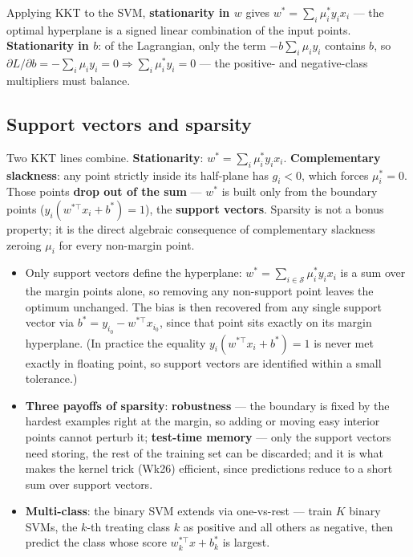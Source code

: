 \documentclass[11pt, a4paper]{article}
\newcommand{\kw}[1]{\textbf{#1}}
\begin{document}
Applying KKT to the SVM, \kw{stationarity in $w$} gives $w^\ast=\sum_i\mu_i^\ast y_i x_i$ — the
optimal hyperplane is a signed linear combination of the input points. \kw{Stationarity in $b$}: of
the Lagrangian, only the term $-b\sum_i\mu_i y_i$ contains $b$, so
$\partial L/\partial b=-\sum_i\mu_i y_i=0\Rightarrow\sum_i\mu_i^\ast y_i=0$ — the positive- and
negative-class multipliers must balance.

\subsection{Support vectors and sparsity}

\begin{trapbox}
Two KKT lines combine. \kw{Stationarity}: $w^\ast=\sum_i\mu_i^\ast y_i x_i$. \kw{Complementary
slackness}: any point strictly inside its half-plane has $g_i<0$, which forces $\mu_i^\ast=0$. Those
points \kw{drop out of the sum} — $w^\ast$ is built only from the boundary points
($y_i(w^{\ast\top}x_i+b^\ast)=1$), the \kw{support vectors}. Sparsity is not a bonus property; it is
the direct algebraic consequence of complementary slackness zeroing $\mu_i$ for every non-margin point.
\end{trapbox}

\begin{itemize}
  \item Only support vectors define the hyperplane: $w^\ast=\sum_{i\in\mathcal S}\mu_i^\ast y_i x_i$
  is a sum over the margin points alone, so removing any non-support point leaves the optimum
  unchanged. The bias is then recovered from any single support vector via
  $b^\ast=y_{i_0}-w^{\ast\top}x_{i_0}$, since that point sits exactly on its margin hyperplane.
  (In practice the equality $y_i(w^{\ast\top}x_i+b^\ast)=1$ is never met exactly in floating point,
  so support vectors are identified within a small tolerance.)
  \item \kw{Three payoffs of sparsity}: \kw{robustness} — the boundary is fixed by the hardest
  examples right at the margin, so adding or moving easy interior points cannot perturb it;
  \kw{test-time memory} — only the support vectors need storing, the rest of the training set can be
  discarded; and it is what makes the kernel trick (Wk26) efficient, since predictions reduce to a
  short sum over support vectors.
  \item \kw{Multi-class}: the binary SVM extends via one-vs-rest — train $K$ binary SVMs, the
  $k$-th treating class $k$ as positive and all others as negative, then predict the class whose
  score $w_k^{\ast\top}x+b_k^\ast$ is largest.
\end{itemize}
\end{document}
